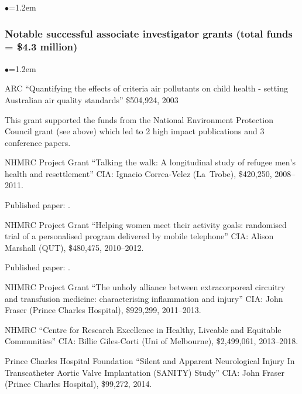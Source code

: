 \documentclass[a4paper,11pt]{article}
\renewcommand{\labelitemi}{$\bullet$}
\begin{document}
\begin{raggedright}
\begin{list}{\labelitemi}{\leftmargin=1.2em}
\end{list}


\subsubsection*{Notable successful associate investigator grants (total funds = \$4.3 million)} %

\begin{list}{\labelitemi}{\leftmargin=1.2em}\addtolength{\itemsep}{-0.5\baselineskip}

\item ARC ``Quantifying the effects of criteria air pollutants on child health - setting Australian air quality standards'' \$504,924, 2003

    This grant supported the funds from the National Environment Protection Council grant (see above) which led to 2 high impact publications  and 3 conference papers. %

\item NHMRC Project Grant ``Talking the walk: A longitudinal study of refugee men's health and resettlement'' CIA: Ignacio Correa-Velez (La~Trobe), \$420,250, 2008--2011. 

    Published paper: .


\item NHMRC Project Grant ``Helping women meet their activity goals: randomised trial of a personalised program delivered by mobile telephone'' CIA: Alison Marshall (QUT), \$480,475, 2010--2012.

    Published paper: .

\item NHMRC Project Grant ``The unholy alliance between extracorporeal circuitry and transfusion medicine: characterising inflammation and injury'' CIA: John Fraser (Prince Charles Hospital), \$929,299, 2011--2013.

\item NHMRC ``Centre for Research Excellence in Healthy, Liveable and Equitable Communities'' CIA: Billie Giles-Corti (Uni of Melbourne), \$2,499,061, 2013--2018.

\item Prince Charles Hospital Foundation ``Silent and Apparent Neurological Injury In Transcatheter Aortic Valve Implantation (SANITY) Study'' CIA: John Fraser (Prince Charles Hospital), \$99,272, 2014.


\end{list}
\end{raggedright}
\end{document}
